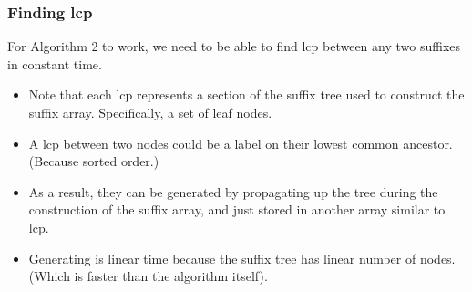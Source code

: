 \documentclass[10pt]{article}
\begin{document}
\subsubsection*{Finding lcp}
For Algorithm 2 to work, we need to be able to find lcp between any two suffixes in constant time.  
\begin{itemize}
	\item Note that each lcp represents a section of the suffix tree used to construct the suffix array.  Specifically, a set of leaf nodes.
	\item A lcp between two nodes could be a label on their lowest common ancestor.  (Because sorted order.) 
	\item As a result, they can be generated by propagating up the tree during the construction of the suffix array, and just stored in another array similar to lcp.
	\item Generating is linear time because the suffix tree has linear number of nodes.  (Which is faster than the algorithm itself).
\end{itemize}
\end{document}
